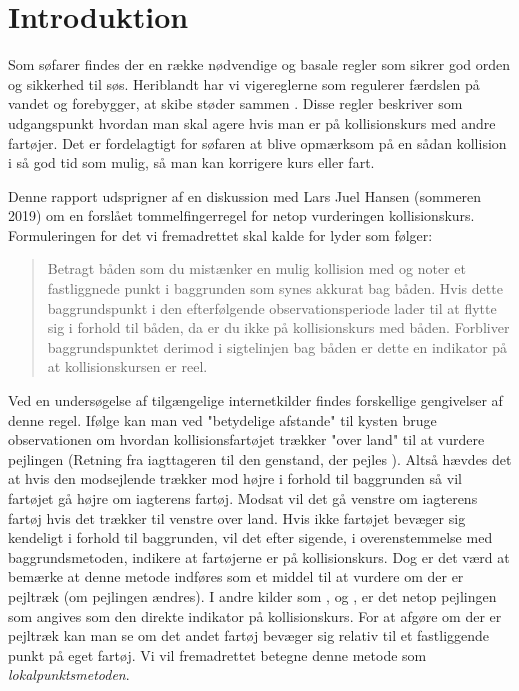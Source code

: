 \documentclass[%
 reprint,
nofootinbib,
aps,
]{revtex4-1}
\begin{document}
\section{Introduktion}
Som søfarer findes der en række nødvendige og basale regler som sikrer god orden og sikkerhed til søs. Heriblandt har vi vigereglerne som regulerer færdslen på vandet og forebygger, at skibe støder sammen \cite{respektforvand}. Disse regler beskriver som udgangspunkt hvordan man skal agere hvis man er på kollisionskurs med andre fartøjer. Det er fordelagtigt for søfaren at blive opmærksom på en sådan kollision i så god tid som mulig, så man kan korrigere kurs eller fart. \par
Denne rapport udsprigner af en diskussion med Lars Juel Hansen (sommeren 2019) om en forslået tommelfingerregel for netop vurderingen kollisionskurs. Formuleringen for det vi fremadrettet skal kalde for  lyder som følger:
\begin{quote}
Betragt båden som du mistænker en mulig kollision med og noter et fastliggnede punkt i baggrunden som synes akkurat bag båden. Hvis dette baggrundspunkt i den efterfølgende observationsperiode lader til at flytte sig i forhold til båden, da er du ikke på kollisionskurs med båden. Forbliver baggrundspunktet derimod i sigtelinjen bag båden er dette en indikator på at kollisionskursen er reel.
\end{quote}
Ved en undersøgelse af tilgængelige internetkilder findes forskellige gengivelser af denne regel. Ifølge \cite{duelighed} kan man ved "betydelige afstande" til kysten bruge observationen om hvordan kollisionsfartøjet trækker "over land" til at vurdere pejlingen (Retning fra iagttageren til den genstand, der pejles \cite{ordbog}). Altså hævdes det at hvis den modsejlende trækker mod højre i forhold til baggrunden så vil fartøjet gå højre om iagterens fartøj. Modsat vil det gå venstre om iagterens fartøj hvis det trækker til venstre over land. Hvis ikke fartøjet bevæger sig kendeligt i forhold til baggrunden, vil det efter sigende, i overenstemmelse med baggrundsmetoden, indikere at fartøjerne er på kollisionskurs. Dog er det værd at bemærke at denne metode indføres som et middel til at vurdere om der er pejltræk (om pejlingen ændres). I andre kilder som \cite{studienoter}, \cite{retsinformation} og \cite{groensund}, er det netop pejlingen som angives som den direkte indikator på kollisionskurs. For at afgøre om der er pejltræk kan man se om det andet fartøj bevæger sig relativ til et fastliggende punkt på eget fartøj. Vi vil fremadrettet betegne denne metode som \textit{lokalpunktsmetoden}. \par
\end{document}
